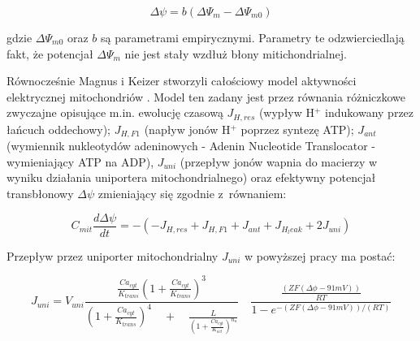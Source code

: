 \[  \Delta\psi = b (\Delta\Psi_m - \Delta\Psi_{m0}) \]

\noindent gdzie $\Delta\Psi_{m0}$ oraz $b$ są parametrami empirycznymi. Parametry te
odzwierciedlają fakt, że potencjał $\Delta\Psi_m$ nie jest stały wzdłuż błony
mitichondrialnej.


Równocześnie Magnus i Keizer stworzyli całościowy model aktywności elektrycznej mitochondriów \cite{Magnus1998}. Model ten zadany jest przez równania różniczkowe zwyczajne opisujące m.in. ewolucję czasową $J_{H,res}$ (wypływ H$^+$ indukowany przez łańcuch oddechowy); $J_{H,F1}$ (napływ jonów H$^+$ poprzez syntezę ATP); $J_{ant}$ (wymiennik nukleotydów adeninowych - Adenin Nucleotide Translocator - wymieniający ATP na ADP), $J_{uni}$ (przepływ jonów wapnia do macierzy w wyniku działania uniportera mitochondrialnego)
oraz efektywny potencjał transbłonowy $\Delta \psi$ \cite{Falcke2004} zmieniający się zgodnie z~równaniem:

\begin{equation}
C_{mit}\frac{d\Delta\psi}{dt}=-\left(-J_{H,res}+J_{H,F1}+J_{ant}+J_{H_leak}+2J_{uni}\right)
\end{equation}


\noindent Przepływ przez uniporter mitochondrialny $J_{uni}$ w powyższej pracy ma postać:

\begin{equation}
{ J }_{ uni }={ V }_{ uni }\frac { \frac { { Ca }_{ cyt } }{ { K }_{ trans } } { \left( 1+\frac { { Ca }_{ cyt } }{ { K }_{ trans } }  \right)  }^{ 3 } }{ { \left( 1+\frac { { Ca }_{ cyt } }{ { K }_{ trans } }  \right)  }^{ 4 }\quad +\quad \frac { L }{ { \left( 1+\frac { { Ca }_{ cyt } }{ { K }_{ act } }  \right)  }^{ { n }_{ a } } }  } \quad \frac { \frac { \left( ZF\left( \Delta \phi -91mV \right)  \right)  }{ RT }  }{ 1-{ e }^{ -{ \left( ZF\left( \Delta \phi -91mV \right)  \right)  }/{ \left( RT \right)  } } }
\end{equation}

